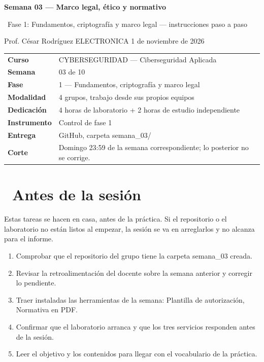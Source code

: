 \documentclass[11pt,a4paper]{article}
\newcommand{\iconoBanda}{microchip}
\newcommand{\bandaTitulo}[3][fondoOscuro]{%
  \begin{tcolorbox}[
    enhanced,
    colback=#1, colframe=#1,
    boxrule=0pt, arc=8pt, outer arc=8pt,
    width=\linewidth,
    top=18pt, bottom=6pt, left=14pt, right=14pt,
    borderline south={3.5pt}{0pt}{cyanNeon},
  ]
    \begin{minipage}[c]{0.07\linewidth}
      \centering
      \textcolor{cyanNeon}{\fontsize{30}{30}\selectfont\faIcon{\iconoBanda}}
    \end{minipage}%
    \hspace{8pt}%
    \begin{minipage}[c]{0.88\linewidth}
      {\fontsize{20}{24}\selectfont\bfseries\color{white}#2}\par\vspace{5pt}%
      \textcolor{cyanNeon!80!white}{\small\faIcon{angle-right}~#3}%
    \end{minipage}
    \vspace{4pt}
  \end{tcolorbox}%
  \vspace{8pt}%
}
\newcommand{\iconotexto}[2]{\textcolor{cyanNeon}{\faIcon{#1}}~#2}
\renewcommand{\iconoBanda}{shield-alt}
\begin{document}
\bandaTitulo[fondoOscuro]{Semana 03 --- Marco legal, ético y normativo}{Fase 1: Fundamentos, criptografía y marco legal --- instrucciones paso a paso}

\begin{center}\small\color{grisTexto}Prof. César Rodríguez \textbar{} ELECTRONICA \textbar{} 1 de noviembre de 2026\end{center}

\begin{tabularx}{\linewidth}{@{}>{\raggedright\arraybackslash}p{4.6cm}X@{}}
\toprule
\textbf{Curso} & CYBERSEGURIDAD --- Ciberseguridad Aplicada \\
\textbf{Semana} & 03 de 10 \\
\textbf{Fase} & 1 --- Fundamentos, criptografía y marco legal \\
\textbf{Modalidad} & 4 grupos, trabajo desde sus propios equipos \\
\textbf{Dedicación} & 4 horas de laboratorio + 2 horas de estudio independiente \\
\textbf{Instrumento} & Control de fase 1 \\
\textbf{Entrega} & GitHub, carpeta semana\_03/ \\
\textbf{Corte} & Domingo 23:59 de la semana correspondiente; lo posterior no se corrige. \\
\bottomrule
\end{tabularx}

\section{\iconotexto{clock}{Antes de la sesión}}

Estas tareas se hacen en casa, antes de la práctica. Si el repositorio o el laboratorio no están listos al empezar, la sesión se va en arreglarlos y no alcanza para el informe.

\begin{enumerate}[leftmargin=1.4em,itemsep=2pt,topsep=3pt]
  \item Comprobar que el repositorio del grupo tiene la carpeta semana\_03 creada.
  \item Revisar la retroalimentación del docente sobre la semana anterior y corregir lo pendiente.
  \item Traer instaladas las herramientas de la semana: Plantilla de autorización, Normativa en PDF.
  \item Confirmar que el laboratorio arranca y que los tres servicios responden antes de la sesión.
  \item Leer el objetivo y los contenidos para llegar con el vocabulario de la práctica.
\end{enumerate}
\end{document}

